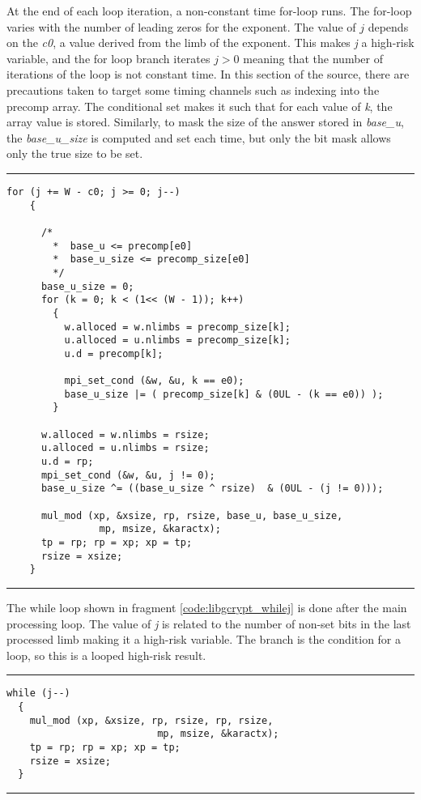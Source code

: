 \documentclass[11pt,a4paper]{article}
\newcommand{\codevar}[1]{\textit{#1}}
\begin{document}
At the end of each loop iteration, a non-constant time for-loop runs. The
for-loop varies with the number of leading zeros for the exponent. The value of
$j$ depends on the \codevar{c0}, a value derived from the limb of the exponent. This
makes \codevar{j} a high-risk variable, and the for loop branch iterates $j > 0$ meaning
that the number of iterations of the loop is not constant time. In this section
of the source, there are precautions taken to target some timing channels such
as indexing into the precomp array. The conditional set makes it such that for
each value of \codevar{k}, the array value is stored. Similarly, to mask the size of the
answer stored in \codevar{base\_u}, the \codevar{base\_u\_size} is computed and set each time, but only
the bit mask allows only the true size to be set.

\vspace{5pt}
\hrule
\begin{lstlisting}[caption=Libgcrypt lines 667- 695]
  for (j += W - c0; j >= 0; j--)
    {

      /*
        *  base_u <= precomp[e0]
        *  base_u_size <= precomp_size[e0]
        */
      base_u_size = 0;
      for (k = 0; k < (1<< (W - 1)); k++)
        {
          w.alloced = w.nlimbs = precomp_size[k];
          u.alloced = u.nlimbs = precomp_size[k];
          u.d = precomp[k];

          mpi_set_cond (&w, &u, k == e0);
          base_u_size |= ( precomp_size[k] & (0UL - (k == e0)) );
        }

      w.alloced = w.nlimbs = rsize;
      u.alloced = u.nlimbs = rsize;
      u.d = rp;
      mpi_set_cond (&w, &u, j != 0);
      base_u_size ^= ((base_u_size ^ rsize)  & (0UL - (j != 0)));

      mul_mod (xp, &xsize, rp, rsize, base_u, base_u_size,
                mp, msize, &karactx);
      tp = rp; rp = xp; xp = tp;
      rsize = xsize;
    }
\end{lstlisting}
\hrule
\vspace{5pt}

The while loop shown in fragment \ref{code:libgcrypt_whilej} is done after the main processing loop. The value of \codevar{j} is
related to the number of non-set bits in the last processed limb making it a
high-risk variable. The branch is the condition for a loop, so this is a looped
high-risk result. 
\vspace{5pt}
\hrule
\begin{lstlisting}[caption=Libgcrypt lines 702-707, label=code:libgcrypt_whilej]
while (j--)
  {
    mul_mod (xp, &xsize, rp, rsize, rp, rsize,
                          mp, msize, &karactx);
    tp = rp; rp = xp; xp = tp;
    rsize = xsize;
  }
\end{lstlisting}
\hrule
\vspace{5pt}
\end{document}
